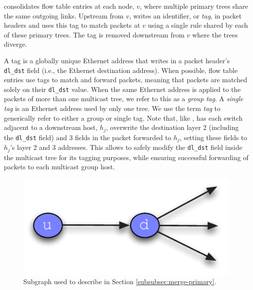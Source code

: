 \merge consolidates flow table entries at each node, $v$, where multiple primary trees share the same outgoing links. 
Upstream from $v$, \merge writes an identifier, or \emph{tag}, in packet headers and uses this tag to match packets at $v$ using a single rule shared by each of these primary trees.
The tag is removed downstream from $v$ where the trees diverge. 

A tag is a globally unique Ethernet address that \merge writes in a packet header's {\tt dl\_dst} field (i.e., the Ethernet destination address).  When possible, \merge flow table entries use 
tags to match and forward packets, meaning that packets are matched solely on their {\tt dl\_dst} value.
When the same Ethernet address is applied to the packets of more than one multicast tree, we refer to this as a \emph{group tag}.  A \emph{single tag} is an 
Ethernet address used by only one tree. We use the term \emph{tag} to generically refer to either a group or single tag. Note that, like \bases, \merge has each switch
adjacent to a downstream host, $h_j$, overwrite the destination layer 2 (including the {\tt dl\_dst} field) and 3 fields in the packet forwarded to $h_j$, setting these fields to $h_j$'s layer
2 and 3 addresses.  This allows \merge to safely modify the {\tt dl\_dst} field inside the multicast tree for its tagging purposes, 
while ensuring successful forwarding of packets to each multicast group host.

\begin{figure}
  \centering
   \includegraphics[scale=0.5]{figs/merger-ud.pdf}
\caption{Subgraph used to describe \merge in Section \ref{subsubsec:merge-primary}.}
\label{fig:merger-ud}
\end{figure}

